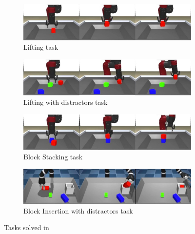 \begin{figure}[t]
    \centering
    \begin{subfigure}[b]{0.6\textwidth}
        \centering
        \includegraphics[width=\textwidth]{figures/images/trail/block_lifting.jpg}
        \caption{Lifting task}
    \end{subfigure}
    \vfill
    \begin{subfigure}[b]{0.6\textwidth}
        \includegraphics[width=\textwidth]{figures/images/trail/block_lifting_with_distractors}
        \caption{Lifting with distractors task}
    \end{subfigure}
    \vfill
    \begin{subfigure}[b]{0.6\textwidth}
        \includegraphics[width=\textwidth]{figures/images/trail/block_stacking}
        \caption{Block Stacking task}
    \end{subfigure}
    \vfill
    \begin{subfigure}[b]{0.6\textwidth}
        \includegraphics[width=\textwidth]{figures/images/trail/block_insertion_with_distractors}
        \caption{Block Insertion with distractors task}
    \end{subfigure}
    \caption{Tasks solved in~\cite{zolna2021task_relevant_ail}}
    \label{fig:trail_tasks}
\end{figure}
